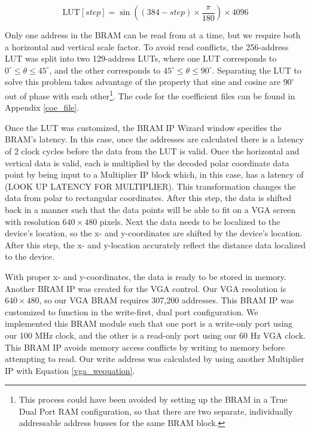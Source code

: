 \begin{equation}
	\textrm{LUT}[step] = \sin((384-step)\times\dfrac{\pi}{180})\times4096
	\label{coe}
\end{equation}

Only one address in the BRAM can be read from at a time, but we require both a horizontal and vertical scale factor. To avoid read conflicts, the 256-address LUT was split into two 129-address LUTs, where one LUT corresponds to $0^\circ{}\leq{}\theta{}\leq45^\circ$, and the other corresponds to $45^\circ{}\leq{}\theta{}\leq90^\circ$. Separating the LUT to solve this problem takes advantage of the property that sine and cosine are $90^\circ$ out of phase with each other\footnote{This process could have been avoided by setting up the BRAM in a True Dual Port RAM configuration, so that there are two separate, individually addressable address busses for the same BRAM block.}. The code for the coefficient files can be found in Appendix \ref{coe_file}.
\par
Once the LUT was customized, the BRAM IP Wizard window specifies the BRAM's latency. In this case, once the addresses are calculated there is a latency of 2 clock cycles before the data from the LUT is valid. Once the horizontal and vertical data is valid, each is multiplied by the decoded polar coordinate data point by being input to a Multiplier IP block which, in this case, has a latency of (LOOK UP LATENCY FOR MULTIPLIER). This transformation changes the data from polar to rectangular coordinates. After this step, the data is shifted back in a manner such that the data points will be able to fit on a VGA screen with resolution $640\times480$ pixels. Next the data needs to be localized to the device's location, so the x- and y-coordinates are shifted by the device's location. After this step, the x- and y-location accurately reflect the distance data localized to the device.
\par
With proper x- and y-coordinates, the data is ready to be stored in memory. Another BRAM IP was created for the VGA control. Our VGA resolution is $640\times480$, so our VGA BRAM requires 307,200 addresses. This BRAM IP was customized to function in the write-first, dual port configuration. We implemented this BRAM module such that one port is a write-only port using our 100 MHz clock, and the other is a read-only port using our 60 Hz VGA clock. This BRAM IP avoids memory access conflicts by writing to memory before attempting to read. Our write address was calculated by using another Multiplier IP with Equation \ref{vga_wequation}.

